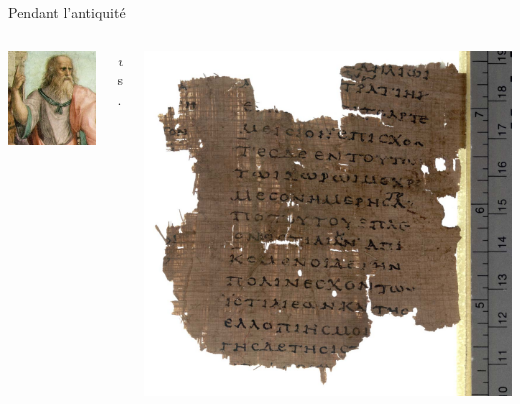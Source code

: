 \begin{frame}{Pendant l'antiquité}
\begin{columns}
	\begin{column}{0.40\linewidth}
		\centering
		\includegraphics[height=0.35\paperheight]{../resources/illustrations/plato} \\
	\end{column}
	\begin{column}{0.09\linewidth} \centering \huge \emph vs. \end{column}
	\begin{column}{0.40\linewidth}
		\centering
		\includegraphics[height=0.35\paperheight]{../resources/illustrations/histories-fragment} \\
	\end{column}

\end{columns}
\end{frame}
